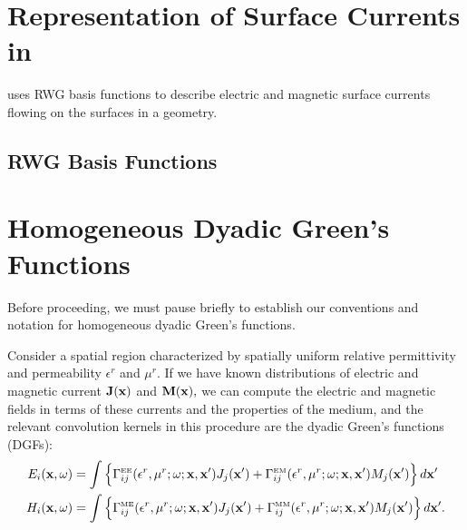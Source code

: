 \documentclass[letterpaper]{article}
\begin{document}
\newpage
\section{Representation of Surface Currents in \ls}

\lss uses RWG basis functions to describe electric and 
magnetic surface currents flowing on the surfaces in a 
geometry.

\subsection*{RWG Basis Functions}

\newpage
\section{Homogeneous Dyadic Green's Functions}
\label{DyadicGreensFunctionsSection}

Before proceeding, we must pause briefly to establish our 
conventions and notation for homogeneous dyadic Green's
functions.

Consider a spatial region characterized by spatially uniform 
relative permittivity and permeability $\epsilon^r$ and 
$\mu^r$. If we have
known distributions of electric and magnetic current
$\mathbf{J}(\mathbf{x})$ and $\mathbf{M}(\mathbf{x}),$
we can compute the electric and magnetic fields in terms
of these currents and the properties of the medium, and  
the relevant convolution kernels in this procedure are
the dyadic Green's functions (DGFs):
\begin{align*}
 E_i(\mathbf{x}, \omega) 
&= 
   \int
    \Big\{
     \Gamma^{\hbox{\tiny{EE}}}_{ij}(\epsilon^r, \mu^r; \omega; \mathbf{x}, \mathbf{x}^\prime) 
     J_j(\mathbf{x}^\prime)
     +
     \Gamma^{\hbox{\tiny{EM}}}_{ij}(\epsilon^r, \mu^r; \omega; \mathbf{x}, \mathbf{x}^\prime) 
     M_j(\mathbf{x}^\prime)
    \Big\}
    \, d\mathbf{x}^\prime
\\
 H_i(\mathbf{x}, \omega) 
&= 
   \int
    \Big\{
     \Gamma^{\hbox{\tiny{ME}}}_{ij}(\epsilon^r, \mu^r; \omega; \mathbf{x}, \mathbf{x}^\prime) 
     J_j(\mathbf{x}^\prime)
     +
     \Gamma^{\hbox{\tiny{MM}}}_{ij}(\epsilon^r, \mu^r; \omega; \mathbf{x}, \mathbf{x}^\prime) 
     M_j(\mathbf{x}^\prime)
    \Big\}
    \, d\mathbf{x}^\prime.
\end{align*}
\end{document}
